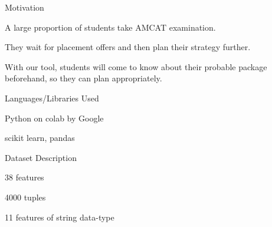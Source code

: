 \documentclass[14pt]{beamer}
\begin{document}
\begin{frame}{Motivation}
\pause
 \begin{fullpageitemize}
  \item \begin{center}A large proportion of students take AMCAT examination.\end{center}
  \item \begin{center}They wait for placement offers and then plan their strategy further. \end{center}
  \item \begin{center}With our tool, students will come to know about their probable package beforehand, so they can plan appropriately. \end{center}
 \end{fullpageitemize}
\end{frame}
\begin{frame}{Languages/Libraries Used}
\pause
 \begin{fullpageitemize}
  \item\begin{center} Python on colab by Google \end{center}
  \item\begin{center}  \end{center}
  \item\begin{center} scikit learn, pandas\end{center}
 \end{fullpageitemize}
\end{frame}
\begin{frame}{Dataset Description}
\pause
 \begin{fullpageitemize}
  \item\begin{center} 38 features \end{center}
  \item\begin{center} 4000 tuples \end{center}
  \item\begin{center} 11 features of string data-type\end{center}
 \end{fullpageitemize}
\end{frame}
\end{document}

